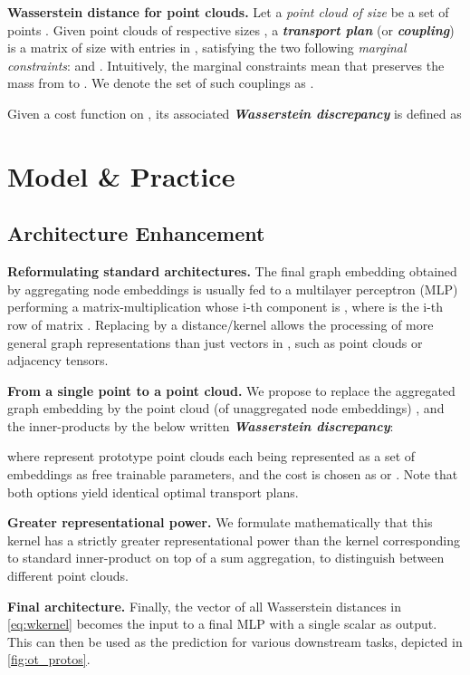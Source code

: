 \documentclass[letterpaper]{article} \usepackage{aaai22}  \usepackage{times}  \usepackage{helvet}  \usepackage{courier}  \usepackage[hyphens]{url}  \usepackage{graphicx} \urlstyle{rm} \def\UrlFont{\rm}  \usepackage{natbib}  \usepackage{caption} \DeclareCaptionStyle{ruled}{labelfont=normalfont,labelsep=colon,strut=off} \frenchspacing  \setlength{\pdfpagewidth}{8.5in}  \setlength{\pdfpageheight}{11in}  \usepackage{algorithm}
\begin{document}
\textbf{Wasserstein distance for point clouds. } Let a \textit{point cloud  of size } be a set of  points . Given point clouds  of respective sizes , a \textbf{\textit{transport plan}} (or \textbf{\textit{coupling}}) is a matrix  of size  with entries in , satisfying the two following \textit{marginal constraints}:  and . Intuitively, the marginal constraints mean that  preserves the mass from  to . We denote the set of such couplings as .

Given a cost function  on , its associated \textbf{\textit{Wasserstein discrepancy}} is defined as
 



\section{Model \& Practice}\label{sec:method}
\subsection{Architecture Enhancement}\label{sec:arch}

\textbf{Reformulating standard architectures. } The final graph embedding  obtained by aggregating node embeddings is usually fed to a  multilayer perceptron (MLP) performing a matrix-multiplication whose i-th component is , where  is the i-th row of matrix . Replacing  by a distance/kernel  allows the processing of more general graph representations than just vectors in , such as point clouds or adjacency tensors. 

\textbf{From a single point to a point cloud. } We propose to replace the aggregated graph embedding  by the point cloud (of unaggregated node embeddings) , and the inner-products  by the below written \textbf{\textit{Wasserstein discrepancy}}:

where  represent  prototype point clouds each being represented as a set of  embeddings as free trainable parameters, and the cost is chosen as  or . Note that both options yield identical optimal transport plans.

\textbf{Greater representational power. } We formulate mathematically that this kernel has a strictly greater representational power than the kernel corresponding to standard inner-product on top of a sum aggregation, to distinguish between different point clouds. 


\textbf{Final architecture. } Finally, the vector of all Wasserstein distances in \cref{eq:wkernel} becomes the input to a final MLP with a single scalar as output. This can then be used as the prediction for various downstream tasks, depicted in \cref{fig:ot_protos}.
\end{document}
